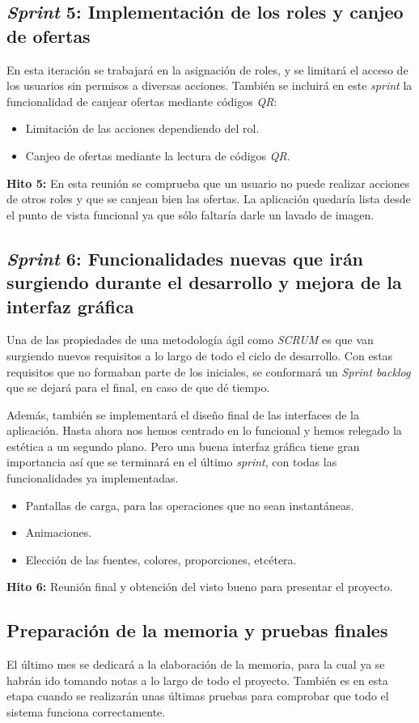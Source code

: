 \subsection{\textit{Sprint} 5: Implementación de los roles y canjeo de ofertas}
En esta iteración se trabajará en la asignación de roles, y se limitará el acceso de los usuarios sin permisos a diversas acciones. También se incluirá en este \textit{sprint} la funcionalidad de canjear ofertas mediante códigos \textit{QR}:
\begin{itemize}
\item Limitación de las acciones dependiendo del rol.
\item Canjeo de ofertas mediante la lectura de códigos \textit{QR}.
\end{itemize}
\textbf{Hito 5:} En esta reunión se comprueba que un usuario no puede realizar acciones de otros roles y que se canjean bien las ofertas. La aplicación quedaría lista desde el punto de vista funcional ya que sólo faltaría darle un lavado de imagen.

\subsection{\textit{Sprint} 6: Funcionalidades nuevas que irán surgiendo durante el desarrollo y mejora de la interfaz gráfica}
Una de las propiedades de una metodología ágil como \textit{SCRUM} es que van surgiendo nuevos requisitos a lo largo de todo el ciclo de desarrollo. Con estas requisitos que no formaban parte de los iniciales, se conformará un \textit{Sprint backlog} que se dejará para el final, en caso de que dé tiempo.

Además, también se implementará el diseño final de las interfaces de la aplicación. Hasta ahora nos hemos centrado en lo funcional y hemos relegado la estética a un segundo plano. Pero una buena interfaz gráfica tiene gran importancia así que se terminará en el último \textit{sprint}, con todas las funcionalidades ya implementadas.
\begin{itemize}
\item Pantallas de carga, para las operaciones que no sean instantáneas.
\item Animaciones.
\item Elección de las fuentes, colores, proporciones, etcétera.
\end{itemize}
\textbf{Hito 6:} Reunión final y obtención del visto bueno para presentar el proyecto.

\subsection{Preparación de la memoria y pruebas finales}
El último mes se dedicará a la elaboración de la memoria, para la cual ya se habrán ido tomando notas a lo largo de todo el proyecto. También es en esta etapa cuando se realizarán unas últimas pruebas para comprobar que todo el sistema funciona correctamente.




